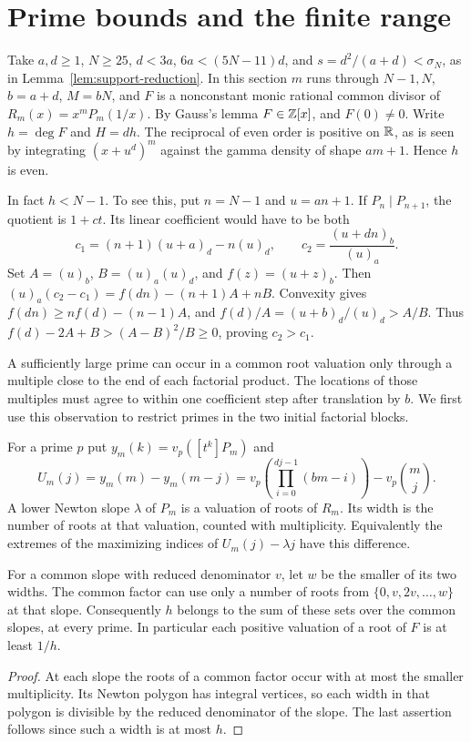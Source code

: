 \section{Prime bounds and the finite range}
\label{sec:arithmetic}

Take \(a,d\ge1\), \(N\ge25\), \(d<3a\), \(6a<(5N-11)d\), and
\(s=d^2/(a+d)<\sigma_N\), as in Lemma~\ref{lem:support-reduction}.
In this section \(m\) runs through \(N-1,N\), \(b=a+d\), \(M=bN\),
and \(F\) is a nonconstant monic rational common divisor of
\(R_m(x)=x^mP_m(1/x)\). By Gauss's lemma \(F\in\mathbb Z[x]\), and \(F(0)\ne0\).
Write \(h=\deg F\) and \(H=dh\). The reciprocal of even order is
positive on \(\mathbb R\), as is seen by integrating \((x+u^d)^m\) against
the gamma density of shape \(am+1\). Hence \(h\) is even.

In fact \(h<N-1\). To see this, put \(n=N-1\) and \(u=an+1\).
If \(P_n\mid P_{n+1}\), the quotient is \(1+ct\). Its linear
coefficient would have to be both
\[
 c_1=(n+1)(u+a)_d-n(u)_d,\qquad
 c_2=\frac{(u+dn)_b}{(u)_a}.
\]
Set \(A=(u)_b\), \(B=(u)_a(u)_d\), and \(f(z)=(u+z)_b\).
Then \((u)_a(c_2-c_1)=f(dn)-(n+1)A+nB\).
Convexity gives \(f(dn)\ge nf(d)-(n-1)A\), and
\(f(d)/A=(u+b)_d/(u)_d>A/B\). Thus
\(f(d)-2A+B>(A-B)^2/B\ge0\), proving \(c_2>c_1\).

A sufficiently large prime can occur in a common root valuation only
through a multiple close to the end of each factorial product. The
locations of those multiples must agree to within one coefficient step
after translation by \(b\). We first use this observation to restrict
primes in the two initial factorial blocks.

For a prime \(p\) put \(y_m(k)=v_p([t^k]P_m)\) and
\[
 U_m(j)=y_m(m)-y_m(m-j)
       =v_p\!\left(\prod_{i=0}^{dj-1}(bm-i)\right)-v_p\binom mj .
\]
A lower Newton slope \(\lambda\) of \(P_m\) is a valuation of roots of
\(R_m\). Its width is the number of roots at that valuation, counted
with multiplicity. Equivalently the extremes of the maximizing indices
of \(U_m(j)-\lambda j\) have this difference.

\begin{lemma}
\label{lem:newton-alloc}
For a common slope with reduced denominator \(v\), let \(w\) be the
smaller of its two widths. The common factor can use only a number of
roots from \(\{0,v,2v,\ldots,w\}\) at that slope. Consequently \(h\)
belongs to the sum of these sets over the common slopes, at every prime.
In particular each positive valuation of a root of \(F\) is at least
\(1/h\).
\end{lemma}
\begin{proof}
At each slope the roots of a common factor occur with at most the
smaller multiplicity. Its Newton polygon has integral vertices, so
each width in that polygon is divisible by the reduced denominator
of the slope. The last assertion follows since such a width is at
most \(h\).
\end{proof}

